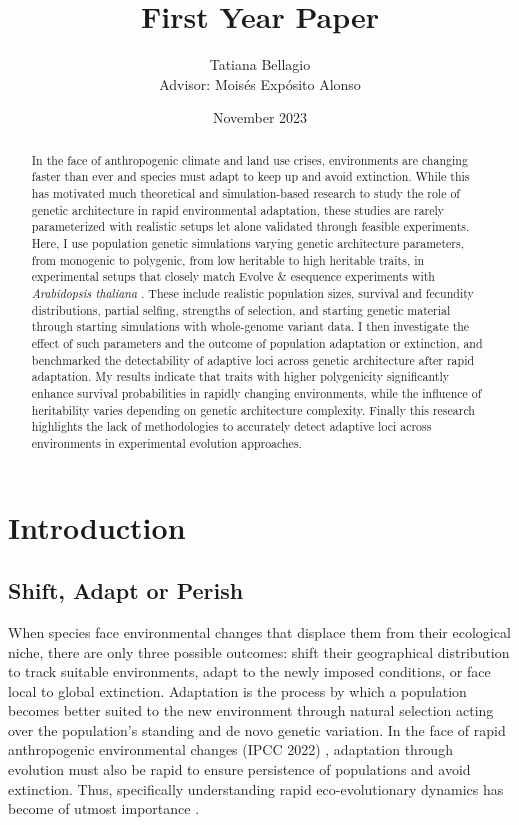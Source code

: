 \documentclass{article}
\title{First Year Paper} %
\author{Tatiana Bellagio \\ Advisor: Moisés Expósito Alonso}
\date{November 2023}
\begin{document}
\maketitle

\begin{abstract}
In the face of anthropogenic climate and land use crises, environments are changing faster than ever and species must adapt to keep up and avoid extinction. While this has motivated much theoretical and simulation-based research to study the role of genetic architecture in rapid environmental adaptation, these studies are rarely parameterized with realistic setups let alone validated through feasible experiments. Here, I use population genetic simulations varying genetic architecture parameters, from monogenic to polygenic, from low heritable to high heritable traits, in experimental setups that closely match Evolve \& esequence experiments with \textit{Arabidopsis thaliana} . These include realistic population sizes, survival and fecundity distributions, partial selfing, strengths of selection, and starting genetic material through starting simulations with whole-genome variant data. I then investigate the effect of such parameters and the outcome of population adaptation or extinction, and benchmarked the detectability of adaptive loci across genetic architecture after rapid adaptation. My results indicate that traits with higher polygenicity significantly enhance survival probabilities in rapidly changing environments, while the influence of heritability varies depending on genetic architecture complexity. Finally this research highlights the lack of methodologies to accurately detect adaptive loci across environments in experimental evolution approaches. 
\end{abstract}

\tableofcontents
\newpage %

\section{Introduction}
\subsection{Shift, Adapt or Perish}
When species face environmental changes that displace them from their ecological niche, there are only three possible outcomes: shift their geographical distribution to track suitable environments, adapt to the newly imposed conditions, or face local to global extinction. Adaptation is the process by which a population becomes better suited to the new environment through natural selection acting over the population's standing and de novo genetic variation. In the face of rapid anthropogenic  environmental changes (IPCC 2022) , adaptation through evolution must also be rapid to ensure persistence of populations and avoid extinction. Thus, specifically understanding rapid eco-evolutionary dynamics has become of utmost importance \citep{Waldvogel2020-dh, Palumbi2002-li, Stockwell2003-da}. 
\end{document}
